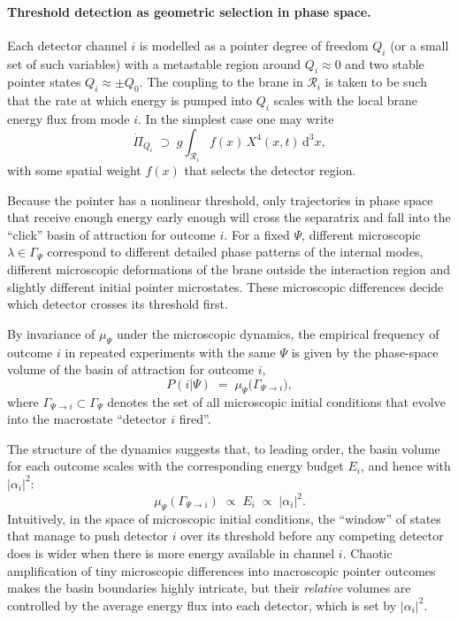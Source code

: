 \paragraph{Threshold detection as geometric selection in phase space.}

Each detector channel $i$ is modelled as a pointer degree of freedom $Q_i$ (or a small set of such variables) with a metastable region around $Q_i \approx 0$ and two stable pointer states $Q_i \approx \pm Q_0$.
The coupling to the brane in $\mathcal{R}_i$ is taken to be such that the rate at which energy is pumped into $Q_i$ scales with the local brane energy flux from mode $i$.
In the simplest case one may write
\begin{equation}
  \dot{\Pi}_{Q_i} \;\supset\;
  g \int_{\mathcal{R}_i} f(x)\, X^4(x,t)\, \mathrm{d}^3x,
\end{equation}
with some spatial weight $f(x)$ that selects the detector region.

Because the pointer has a nonlinear threshold, only trajectories in phase space that receive enough energy early enough will cross the separatrix and fall into the ``click'' basin of attraction for outcome $i$.
For a fixed $\Psi$, different microscopic $\lambda \in \Gamma_\Psi$ correspond to different detailed phase patterns of the internal modes, different microscopic deformations of the brane outside the interaction region and slightly different initial pointer microstates.
These microscopic differences decide which detector crosses its threshold first.

By invariance of $\mu_\Psi$ under the microscopic dynamics, the empirical frequency of outcome $i$ in repeated experiments with the same $\Psi$ is given by the phase-space volume of the basin of attraction for outcome $i$,
\begin{equation}
  P(i|\Psi) \;=\; \mu_\Psi\bigl(\Gamma_{\Psi \to i}\bigr),
\end{equation}
where $\Gamma_{\Psi \to i} \subset \Gamma_\Psi$ denotes the set of all microscopic initial conditions that evolve into the macrostate ``detector $i$ fired''.

The structure of the dynamics suggests that, to leading order, the basin volume for each outcome scales with the corresponding energy budget $E_i$, and hence with $|\alpha_i|^2$:
\begin{equation}
  \mu_\Psi(\Gamma_{\Psi \to i}) \;\propto\; E_i \;\propto\; |\alpha_i|^2.
\end{equation}
Intuitively, in the space of microscopic initial conditions, the ``window'' of states that manage to push detector $i$ over its threshold before any competing detector does is wider when there is more energy available in channel $i$.
Chaotic amplification of tiny microscopic differences into macroscopic pointer outcomes makes the basin boundaries highly intricate, but their \emph{relative} volumes are controlled by the average energy flux into each detector, which is set by $|\alpha_i|^2$.

